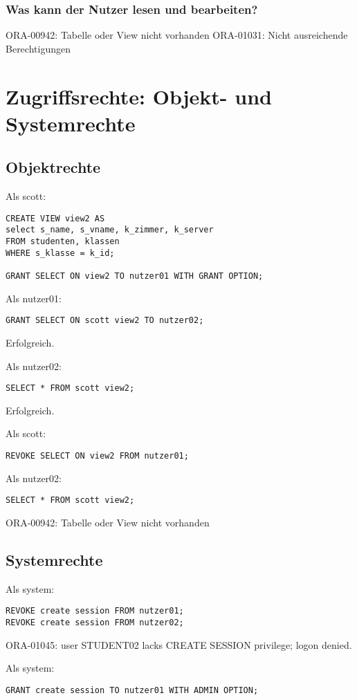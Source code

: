 \documentclass[10pt]{scrreprt}
\begin{document}
\subsubsection{Was kann der Nutzer lesen und bearbeiten?}
ORA-00942: Tabelle oder View nicht vorhanden
ORA-01031: Nicht ausreichende Berechtigungen
\section{Zugriffsrechte: Objekt- und Systemrechte}
\subsection{Objektrechte}
Als scott:
\begin{lstlisting}[style=sql]
CREATE VIEW view2 AS
select s_name, s_vname, k_zimmer, k_server
FROM studenten, klassen
WHERE s_klasse = k_id;

GRANT SELECT ON view2 TO nutzer01 WITH GRANT OPTION;
\end{lstlisting}

Als nutzer01:
\begin{lstlisting}[style=sql]
GRANT SELECT ON scott view2 TO nutzer02;
\end{lstlisting}
Erfolgreich.

Als nutzer02:
\begin{lstlisting}[style=sql]
SELECT * FROM scott view2;
\end{lstlisting}
Erfolgreich.

Als scott:
\begin{lstlisting}[style=sql]
REVOKE SELECT ON view2 FROM nutzer01;
\end{lstlisting}

Als nutzer02:
\begin{lstlisting}[style=sql]
SELECT * FROM scott view2;
\end{lstlisting}
ORA-00942: Tabelle oder View nicht vorhanden

\subsection{Systemrechte}
Als system:
\begin{lstlisting}[style=sql]
REVOKE create session FROM nutzer01;
REVOKE create session FROM nutzer02;
\end{lstlisting}
ORA-01045: user STUDENT02 lacks CREATE SESSION privilege; logon denied.

Als system:
\begin{lstlisting}[style=sql]
GRANT create session TO nutzer01 WITH ADMIN OPTION;
\end{lstlisting}
\end{document}
